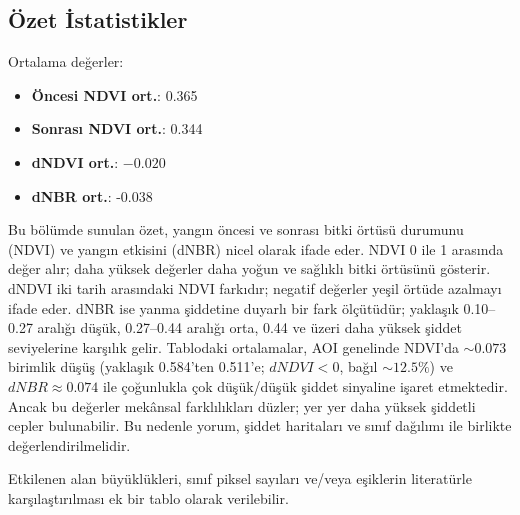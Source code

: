 \documentclass[11pt,a4paper]{article}
\begin{document}
\subsection{Özet İstatistikler}
\noindent Ortalama değerler:
\begin{itemize}
  \item \textbf{Öncesi NDVI ort.}: 0.365
  \item \textbf{Sonrası NDVI ort.}: 0.344
  \item \textbf{dNDVI ort.}: $-0.020$
  \item \textbf{dNBR ort.}: -0.038
\end{itemize}
Bu bölümde sunulan özet, yangın öncesi ve sonrası bitki örtüsü durumunu (NDVI) ve yangın etkisini (dNBR) nicel olarak ifade eder. NDVI 0 ile 1 arasında değer alır; daha yüksek değerler daha yoğun ve sağlıklı bitki örtüsünü gösterir. dNDVI iki tarih arasındaki NDVI farkıdır; negatif değerler yeşil örtüde azalmayı ifade eder. dNBR ise yanma şiddetine duyarlı bir fark ölçütüdür; yaklaşık 0.10--0.27 aralığı düşük, 0.27--0.44 aralığı orta, 0.44 ve üzeri daha yüksek şiddet seviyelerine karşılık gelir. Tablodaki ortalamalar, AOI genelinde NDVI’da \(\sim0.073\) birimlik düşüş (yaklaşık 0.584'ten 0.511'e; \(dNDVI<0\), bağıl \(\sim12.5\%\)) ve \(dNBR \approx 0.074\) ile çoğunlukla çok düşük/düşük şiddet sinyaline işaret etmektedir. Ancak bu değerler mekânsal farklılıkları düzler; yer yer daha yüksek şiddetli cepler bulunabilir. Bu nedenle yorum, şiddet haritaları ve sınıf dağılımı ile birlikte değerlendirilmelidir.

Etkilenen alan büyüklükleri, sınıf piksel sayıları ve/veya eşiklerin literatürle
karşılaştırılması ek bir tablo olarak verilebilir.
\end{document}
